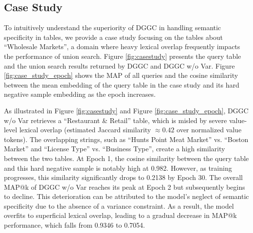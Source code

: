 \subsection{Case Study}
\label{app:case_study}

To intuitively understand the superiority of DGGC in handling semantic specificity in tables, we provide a case study focusing on the tables about ``Wholesale Markets'', a domain where heavy lexical overlap frequently impacts the performance of union search. Figure \ref{fig:casestudy} presents the query table and the union search results returned by DGGC and DGGC w/o Var. Figure \ref{fig:case_study_epoch} shows the MAP of all queries and the cosine similarity between the mean embedding of the query table in the case study and its hard negative sample embedding as the epoch increases.

As illustrated in Figure \ref{fig:casestudy} and Figure \ref{fig:case_study_epoch}, DGGC w/o Var retrieves a ``Restaurant \& Retail'' table, which is misled by severe value-level lexical overlap (estimated Jaccard similarity $\approx 0.42$ over normalized value tokens). The overlapping strings, such as ``Hunts Point Meat Market'' vs. ``Boston Market'' and ``License Type'' vs. ``Business Type'', create a high similarity between the two tables. At Epoch 1, the cosine similarity between the query table and this hard negative sample is notably high at 0.982. However, as training progresses, this similarity significantly drops to 0.2138 by Epoch 30. The overall MAP@k of DGGC w/o Var reaches its peak at Epoch 2 but subsequently begins to decline. This deterioration can be attributed to the model's neglect of semantic specificity due to the absence of a variance constraint. As a result, the model overfits to superficial lexical overlap, leading to a gradual decrease in MAP@k performance, which falls from 0.9346 to 0.7054.

